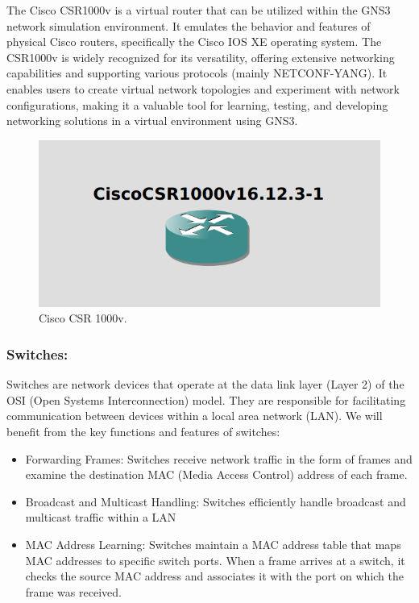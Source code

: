 The Cisco CSR1000v is a virtual router that can be utilized within the GNS3 network simulation environment. It emulates the behavior and features of physical Cisco routers, specifically the Cisco IOS XE operating system. The CSR1000v is widely recognized for its versatility, offering extensive networking capabilities and supporting various protocols (mainly NETCONF-YANG). It enables users to create virtual network topologies and experiment with network configurations, making it a valuable tool for learning, testing, and developing networking solutions in a virtual environment using GNS3.

\begin{figure}[h]
    \centering
    \includegraphics[width=0.7\linewidth]{Images/cisco1000v.png}
    \caption{Cisco CSR 1000v.}
    \label{fig:example}
\end{figure}

\subsubsection{Switches:}
Switches are network devices that operate at the data link layer (Layer 2) of the OSI (Open Systems Interconnection) model. They are responsible for facilitating communication between devices within a local area network (LAN). We will benefit from the key functions and features of switches:


\begin{itemize}
    \item Forwarding Frames: Switches receive network traffic in the form of frames and examine the destination MAC (Media Access Control) address of each frame. 
    \item Broadcast and Multicast Handling: Switches efficiently handle broadcast and multicast traffic within a LAN
    \item MAC Address Learning: Switches maintain a MAC address table that maps MAC addresses to specific switch ports. When a frame arrives at a switch, it checks the source MAC address and associates it with the port on which the frame was received.
\end{itemize}


